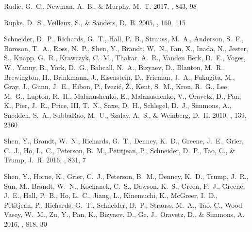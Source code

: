 \documentclass[iop]{emulateapj}
\begin{document}
\begin{thebibliography}{52}
{Rudie}, G.~C., {Newman}, A.~B., \& {Murphy}, M.~T. 2017, \apj, 843, 98

{Rupke}, D.~S., {Veilleux}, S., \& {Sanders}, D.~B. 2005, \apjs, 160, 115

{Schneider}, D.~P., {Richards}, G.~T., {Hall}, P.~B., {Strauss}, M.~A.,
  {Anderson}, S.~F., {Boroson}, T.~A., {Ross}, N.~P., {Shen}, Y., {Brandt},
  W.~N., {Fan}, X., {Inada}, N., {Jester}, S., {Knapp}, G.~R., {Krawczyk},
  C.~M., {Thakar}, A.~R., {Vanden Berk}, D.~E., {Voges}, W., {Yanny}, B.,
  {York}, D.~G., {Bahcall}, N.~A., {Bizyaev}, D., {Blanton}, M.~R.,
  {Brewington}, H., {Brinkmann}, J., {Eisenstein}, D., {Frieman}, J.~A.,
  {Fukugita}, M., {Gray}, J., {Gunn}, J.~E., {Hibon}, P., {Ivezi{\'c}}, {\v
  Z}., {Kent}, S.~M., {Kron}, R.~G., {Lee}, M.~G., {Lupton}, R.~H.,
  {Malanushenko}, E., {Malanushenko}, V., {Oravetz}, D., {Pan}, K., {Pier},
  J.~R., {Price}, III, T.~N., {Saxe}, D.~H., {Schlegel}, D.~J., {Simmons}, A.,
  {Snedden}, S.~A., {SubbaRao}, M.~U., {Szalay}, A.~S., \& {Weinberg}, D.~H.
  2010, \aj, 139, 2360

{Shen}, Y., {Brandt}, W.~N., {Richards}, G.~T., {Denney}, K.~D., {Greene},
  J.~E., {Grier}, C.~J., {Ho}, L.~C., {Peterson}, B.~M., {Petitjean}, P.,
  {Schneider}, D.~P., {Tao}, C., \& {Trump}, J.~R. 2016{}, \apj,
  831, 7

{Shen}, Y., {Horne}, K., {Grier}, C.~J., {Peterson}, B.~M., {Denney}, K.~D.,
  {Trump}, J.~R., {Sun}, M., {Brandt}, W.~N., {Kochanek}, C.~S., {Dawson},
  K.~S., {Green}, P.~J., {Greene}, J.~E., {Hall}, P.~B., {Ho}, L.~C., {Jiang},
  L., {Kinemuchi}, K., {McGreer}, I.~D., {Petitjean}, P., {Richards}, G.~T.,
  {Schneider}, D.~P., {Strauss}, M.~A., {Tao}, C., {Wood-Vasey}, W.~M., {Zu},
  Y., {Pan}, K., {Bizyaev}, D., {Ge}, J., {Oravetz}, D., \& {Simmons}, A.
  2016{}, \apj, 818, 30


\end{thebibliography}
\end{document}
